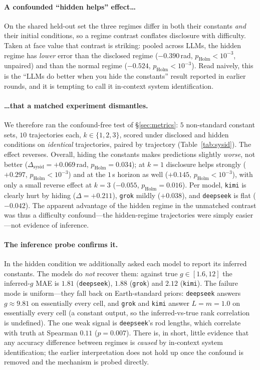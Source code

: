 \documentclass{article}
\begin{document}
\paragraph{A confounded ``hidden helps'' effect\dots} On the shared held-out set the
three regimes differ in both their constants \emph{and} their initial conditions, so
a regime contrast conflates disclosure with difficulty. Taken at face value that
contrast is striking: pooled across LLMs, the hidden regime has \emph{lower} error
than the disclosed regime ($-0.390$\,rad, $p_{\mathrm{Holm}}{<}10^{-3}$, unpaired)
and than the normal regime ($-0.524$, $p_{\mathrm{Holm}}{<}10^{-3}$). Read naively,
this is the ``LLMs do better when you hide the constants'' result reported in earlier
rounds, and it is tempting to call it in-context system identification.

\paragraph{\dots that a matched experiment dismantles.} We therefore ran the
confound-free test of \S\ref{sec:metrics}: $5$ non-standard constant sets, $10$
trajectories each, $k\in\{1,2,3\}$, scored under disclosed and hidden conditions on
\emph{identical} trajectories, paired by trajectory (Table~\ref{tab:sysid}). The
effect reverses. Overall, hiding the constants makes predictions slightly
\emph{worse}, not better ($\Delta_{\mathrm{sysid}}{=}{+}0.069$\,rad,
$p_{\mathrm{Holm}}{=}0.034$); at $k{=}1$ disclosure helps strongly
($+0.297$, $p_{\mathrm{Holm}}{<}10^{-3}$) and at the $1$\,s horizon as well
($+0.145$, $p_{\mathrm{Holm}}{<}10^{-3}$), with only a small reverse effect at
$k{=}3$ ($-0.055$, $p_{\mathrm{Holm}}{=}0.016$). Per model, \texttt{kimi} is clearly
hurt by hiding ($\Delta{=}{+}0.211$), \texttt{grok} mildly ($+0.038$), and
\texttt{deepseek} is flat ($-0.042$). The apparent advantage of the hidden regime in
the unmatched contrast was thus a difficulty confound---the hidden-regime
trajectories were simply easier---not evidence of inference.

\paragraph{The inference probe confirms it.} In the hidden condition we additionally
asked each model to report its inferred constants. The models do \emph{not} recover
them: against true $g\in[1.6,12]$ the inferred-$g$ MAE is $1.81$ (\texttt{deepseek}),
$1.88$ (\texttt{grok}) and $2.12$ (\texttt{kimi}). The failure mode is uniform---they
fall back on Earth-standard priors: \texttt{deepseek} answers $g{\approx}9.81$ on
essentially every cell, and \texttt{grok} and \texttt{kimi} answer $L{=}m{=}1.0$ on
essentially every cell (a constant output, so the inferred-vs-true rank correlation
is undefined). The one weak signal is \texttt{deepseek}'s rod lengths, which
correlate with truth at Spearman $0.11$ ($p{=}0.007$). There is, in short, little
evidence that any accuracy difference between regimes is \emph{caused} by in-context
system identification; the earlier interpretation does not hold up once the confound
is removed and the mechanism is probed directly.
\end{document}
